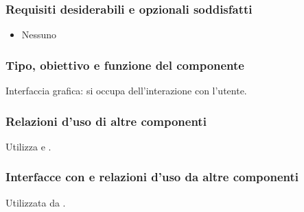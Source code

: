 \subsubsection*{Requisiti desiderabili e opzionali soddisfatti}
\begin{itemize}
    \item Nessuno
\end{itemize}
\subsubsection*{Tipo, obiettivo e funzione del componente}
Interfaccia grafica: si occupa dell'interazione con l'utente.
\subsubsection*{Relazioni d'uso di altre componenti}
Utilizza  e .
\subsubsection*{Interfacce con e relazioni d'uso da altre componenti}
Utilizzata da .
